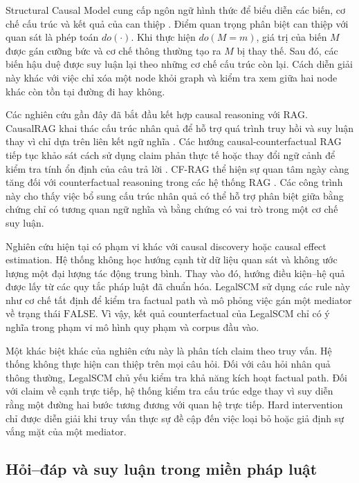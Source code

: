Structural Causal Model cung cấp ngôn ngữ hình thức để biểu diễn các biến,
cơ chế cấu trúc và kết quả của can thiệp
\cite{pearl2009causality}. Điểm quan trọng phân biệt can thiệp với quan sát
là phép toán \(do(\cdot)\). Khi thực hiện \(do(M=m)\), giá trị của biến
\(M\) được gán cưỡng bức và cơ chế thông thường tạo ra \(M\) bị thay thế.
Sau đó, các biến hậu duệ được suy luận lại theo những cơ chế cấu trúc còn
lại. Cách diễn giải này khác với việc chỉ xóa một node khỏi graph và kiểm
tra xem giữa hai node khác còn tồn tại đường đi hay không.

Các nghiên cứu gần đây đã bắt đầu kết hợp causal reasoning với RAG.
CausalRAG khai thác cấu trúc nhân quả để hỗ trợ quá trình truy hồi và suy
luận thay vì chỉ dựa trên liên kết ngữ nghĩa
\cite{wang2025causalrag}. Các hướng causal-counterfactual RAG tiếp tục khảo
sát cách sử dụng claim phản thực tế hoặc thay đổi ngữ cảnh để kiểm tra tính
ổn định của câu trả lời
\cite{khadilkar2025causalcounterfactualrag}. CF-RAG thể hiện sự quan tâm
ngày càng tăng đối với counterfactual reasoning trong các hệ thống RAG
\cite{qin2026cfrag}. Các công trình này cho thấy việc bổ sung cấu trúc nhân
quả có thể hỗ trợ phân biệt giữa bằng chứng chỉ có tương quan ngữ nghĩa và
bằng chứng có vai trò trong một cơ chế suy luận.

Nghiên cứu hiện tại có phạm vi khác với causal discovery hoặc causal effect
estimation. Hệ thống không học hướng cạnh từ dữ liệu quan sát và không ước
lượng một đại lượng tác động trung bình. Thay vào đó, hướng điều
kiện--hệ quả được lấy từ các quy tắc pháp luật đã chuẩn hóa. LegalSCM sử
dụng các rule này như cơ chế tất định để kiểm tra factual path và mô phỏng
việc gán một mediator về trạng thái \(\mathrm{FALSE}\). Vì vậy, kết quả
counterfactual của LegalSCM chỉ có ý nghĩa trong phạm vi mô hình quy phạm và
corpus đầu vào.

Một khác biệt khác của nghiên cứu này là phân tích claim theo truy vấn. Hệ
thống không thực hiện can thiệp trên mọi câu hỏi. Đối với câu hỏi nhân quả
thông thường, LegalSCM chủ yếu kiểm tra khả năng kích hoạt factual path. Đối
với claim về cạnh trực tiếp, hệ thống kiểm tra cấu trúc edge thay vì suy
diễn rằng một đường hai bước tương đương với quan hệ trực tiếp. Hard
intervention chỉ được diễn giải khi truy vấn thực sự đề cập đến việc loại
bỏ hoặc giả định sự vắng mặt của một mediator.

\subsection{Hỏi--đáp và suy luận trong miền pháp luật}

